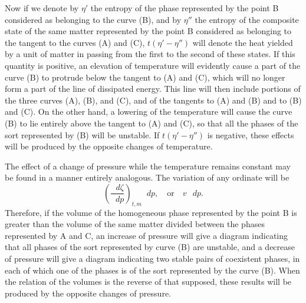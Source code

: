 \documentclass[11pt]{article}
\newcommand{\dd}{\mathop{}\!d}
\begin{document}
Now if we denote by $\eta'$ the entropy of the phase represented by the point B considered as belonging to the curve (B), and by $\eta''$ the entropy of the composite state of the same matter represented by the point B considered as belonging to the tangent to the curves (A) and (C), $t(\eta'-\eta'')$ will denote the heat yielded by a unit of matter in passing from the first to the second of these states. If this quantity is positive, an elevation of temperature will evidently cause a part of the curve (B) to protrude below the tangent to (A) and (C), which will no longer form a part of the line of dissipated energy. This line will then include portions of the three curves (A), (B), and (C), and of the tangents to (A) and (B) and to (B) and (C). On the other hand, a lowering of the temperature will cause the curve (B) to lie entirely above the tangent to (A) and (C), so that all the phases of the sort represented by (B) will be unstable. If $t(\eta'-\eta'')$ is negative, these effects will be produced by the opposite changes of temperature.

The effect of a change of pressure while the temperature remains constant may be found in a manner entirely analogous. The variation of any ordinate will be
\[
\left(\frac{\dd\zeta}{\dd p}\right)_{t,m}\dd p,
\quad\text{or}\quad v\,\dd p.
\]
Therefore, if the volume of the homogeneous phase represented by the point B is greater than the volume of the same matter divided between the phases represented by A and C, an increase of pressure will give a diagram indicating that all phases of the sort represented by curve (B) are unstable, and a decrease of pressure will give a diagram indicating two stable pairs of coexistent phases, in each of which one of the phases is of the sort represented by the curve (B). When the relation of the volumes is the reverse of that supposed, these results will be produced by the opposite changes of pressure.
\end{document}

